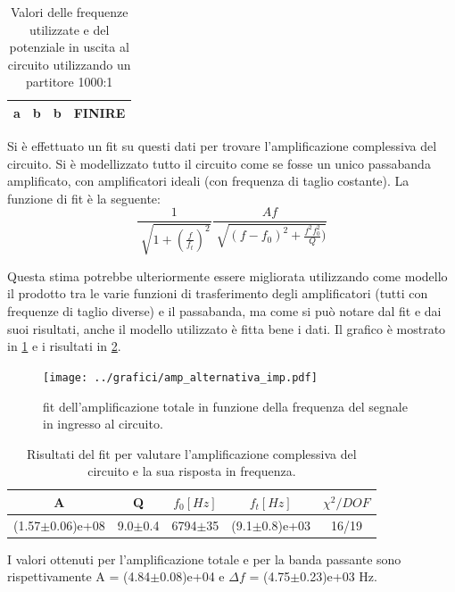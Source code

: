 \documentclass[a4paper,10pt]{article}
\begin{document}
\begin{table}[H]
	\centering
	\begin{tabular}{cccc}
		\hline
a&b&b&FINIRE\\
		\hline
	\end{tabular}
	\caption{Valori delle frequenze utilizzate e del potenziale in uscita al circuito utilizzando un partitore 1000:1}
	\label{tab:partit}
\end{table}

Si è effettuato un fit su questi dati per trovare l'amplificazione complessiva del circuito. Si è modellizzato tutto il circuito come se fosse un unico passabanda amplificato, con amplificatori ideali (con frequenza di taglio costante). La funzione di fit è la seguente:
\begin{equation}
\frac{1}{\sqrt[]{1+(\frac{f}{f_t})^2}} \frac{A f}{\sqrt[]{(f - f_0)^2+ \frac{f^2 f_0^2}{Q} )}} 
\end{equation}

Questa stima potrebbe ulteriormente essere migliorata utilizzando come modello il prodotto tra le varie funzioni di trasferimento degli amplificatori (tutti con frequenze di taglio diverse) e il passabanda, ma come si può notare dal fit e dai suoi risultati, anche il modello utilizzato è fitta bene i dati. Il grafico è mostrato in \cref{fig:ampltot} e i risultati in \cref{tab:risult}.

\begin{figure}[H]
	\centering
	\texttt{[image: ../grafici/amp\_alternativa\_imp.pdf]}
	\caption{fit dell'amplificazione totale in funzione della frequenza del segnale in ingresso al circuito.}
	\label{fig:ampltot}
\end{figure}

\begin{table}[H]
	\centering
	\begin{tabular}{c|c|c|c|c}
	A & Q & $f_0[Hz]$ & $f_t[Hz]$ & $\chi^2/DOF$ \\
	\hline
	(1.57$\pm$0.06)e+08 & 9.0$\pm$0.4 & 6794$\pm$35 & (9.1$\pm$0.8)e+03 & 16/19 \\
	\end{tabular}
	\caption{Risultati del fit per valutare l'amplificazione complessiva del circuito e la sua risposta in frequenza.}
	\label{tab:risult}
\end{table}

I valori ottenuti per l'amplificazione totale e per la banda passante sono rispettivamente A = (4.84$\pm$0.08)e+04 e $\Delta f$ = (4.75$\pm$0.23)e+03 Hz.
\end{document}
